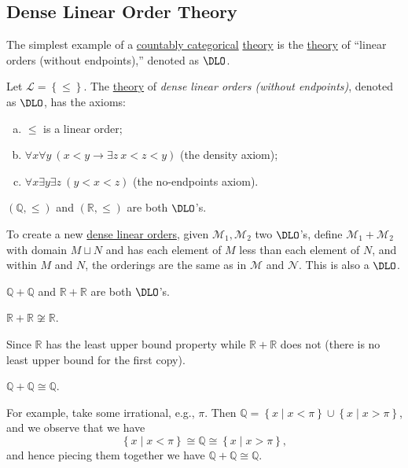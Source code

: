 \subsection{Dense Linear Order Theory}
The simplest example of a \hyperref[def:countably-categorical]{countably categorical} \hyperref[def:theory]{theory} is the \hyperref[def:theory]{theory} of ``linear orders (without endpoints),''  denoted as \hyperref[def:DLO]{\(\DLO\)}.

\begin{definition}[\(\DLO\)]\label{def:DLO}
	Let \(\mathcal{L} = \left\{ \leq \right\} \). The \hyperref[def:theory]{theory} of \emph{dense linear orders (without endpoints)}, denoted as \(\DLO\), has the axioms:
	\begin{enumerate}[(a)]
		\item \(\leq \) is a linear order;
		\item \(\forall x \forall y\ (x < y \to \exists z\ x < z < y)\) (the density axiom);
		\item \(\forall x \exists y \exists z\ (y < x < z)\) (the no-endpoints axiom).
	\end{enumerate}
\end{definition}

\begin{eg}
	\((\mathbb{Q} , \leq )\) and \((\mathbb{R} , \leq )\) are both \(\DLO\)'s.
\end{eg}

To create a new \hyperref[def:DLO]{dense linear orders}, given \(\mathcal{M} _1, \mathcal{M} _2\) two \(\DLO\)'s, define \(\mathcal{M} _1 + \mathcal{M} _2\) with domain \(M \sqcup N\) and has each element of \(M\) less than each element of \(N\), and within \(M\) and \(N\), the orderings are the same as in \(\mathcal{M} \) and \(\mathcal{N} \). This is also a \(\DLO\).

\begin{eg}
	\(\mathbb{Q} + \mathbb{Q} \) and \(\mathbb{R} + \mathbb{R} \) are both \(\DLO\)'s.
\end{eg}

\begin{eg}
	\(\mathbb{R} + \mathbb{R} \not \cong \mathbb{R} \).
\end{eg}
\begin{explanation}
	Since \(\mathbb{R} \) has the least upper bound property while \(\mathbb{R} + \mathbb{R} \) does not (there is no least upper bound for the first copy).
\end{explanation}

\begin{eg}
	\(\mathbb{Q} + \mathbb{Q} \cong \mathbb{Q} \).
\end{eg}
\begin{explanation}
	For example, take some irrational, e.g., \(\pi \). Then \(\mathbb{Q} = \left\{ x \mid x < \pi \right\} \cup \left\{ x \mid x > \pi \right\} \), and we observe that we have
	\[
		\left\{ x \mid x < \pi \right\} \cong \mathbb{Q} \cong \left\{ x \mid x > \pi \right\},
	\]
	and hence piecing them together we have \(\mathbb{Q} + \mathbb{Q} \cong \mathbb{Q} \).
\end{explanation}

